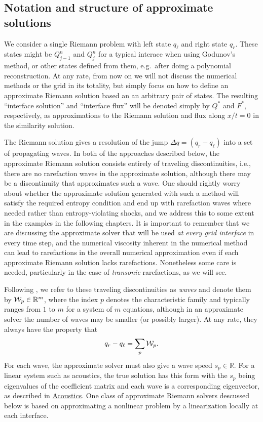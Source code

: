 \documentclass[11pt]{article}
\begin{document}
    \hypertarget{notation-and-structure-of-approximate-solutions}{%
\subsection{Notation and structure of approximate
solutions}\label{notation-and-structure-of-approximate-solutions}}

    We consider a single Riemann problem with left state \(q_\ell\) and
right state \(q_r\). These states might be \(Q_{j-1}^n\) and \(Q_j^n\)
for a typical interace when using Godunov's method, or other states
defined from them, e.g.~after doing a polynomial reconstruction. At any
rate, from now on we will not discuss the numerical methods or the grid
in its totality, but simply focus on how to define an approximate
Riemann solution based an an arbitrary pair of states. The resulting
``interface solution'' and ``interface flux'' will be denoted simply by
\(Q^*\) and \(F^*\), respectively, as approximations to the Riemann
solution and flux along \(x/t =0\) in the similarity solution.

The Riemann solution gives a resolution of the jump
\(\Delta q = (q_r - q_\ell)\) into a set of propagating waves. In both
of the approaches described below, the approximate Riemann solution
consists entirely of traveling discontinuities, i.e., there are no
rarefaction waves in the approximate solution, although there may be a
discontinuity that approximates such a wave. One should rightly worry
about whether the approximate solution generated with such a method will
satisfy the required entropy condition and end up with rarefaction waves
where needed rather than entropy-violating shocks, and we address this
to some extent in the examples in the following chapters. It is
important to remember that we are discussing the approximate solver that
will be used \emph{at every grid interface} in every time step, and the
numerical viscosity inherent in the numerical method can lead to
rarefactions in the overall numerical approximation even if each
approximate Riemann solution lacks rarefactions. Nonetheless some care
is needed, particularly in the case of \emph{transonic} rarefactions, as
we will see.

Following \cite{fvmhp}, we refer to these traveling discontinuities as
\emph{waves} and denote them by \({\cal W}_p \in {\mathbb R}^m\), where
the index \(p\) denotes the characteristic family and typically ranges
from \(1\) to \(m\) for a system of \(m\) equations, although in an
approximate solver the number of waves may be smaller (or possibly
larger). At any rate, they always have the property that
\begin{align}\label{Wsum}
q_r - q_\ell = \sum_{p} {\cal W}_p.
\end{align} For each wave, the approximate solver must also give a wave
speed \(s_p \in{\mathbb R}\). For a linear system such as acoustics, the
true solution has this form with the \(s_p\) being eigenvalues of the
coefficient matrix and each wave is a corresponding eigenvector, as
described in \href{Acoustics.ipynb}{Acoustics}. One class of approximate
Riemann solvers descussed below is based on approximating a nonlinear
problem by a linearization locally at each interface.
\end{document}
